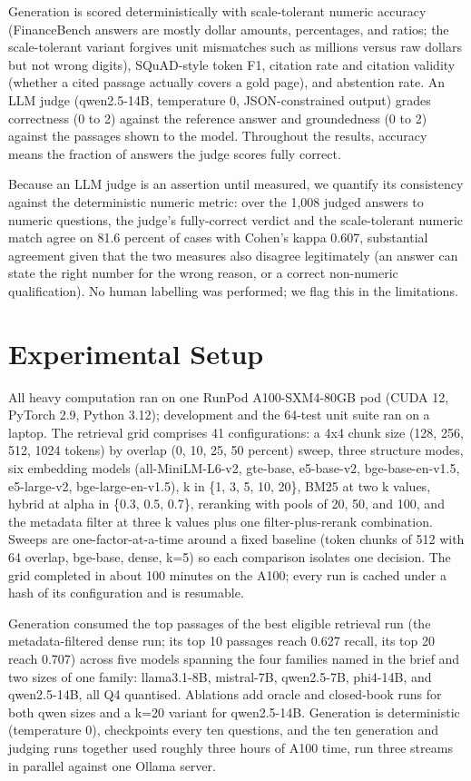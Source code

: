 \documentclass[
  11pt,
]{article}
\begin{document}
Generation is scored deterministically with scale-tolerant numeric
accuracy (FinanceBench answers are mostly dollar amounts, percentages,
and ratios; the scale-tolerant variant forgives unit mismatches such as
millions versus raw dollars but not wrong digits), SQuAD-style token F1,
citation rate and citation validity (whether a cited passage actually
covers a gold page), and abstention rate. An LLM judge (qwen2.5-14B,
temperature 0, JSON-constrained output) grades correctness (0 to 2)
against the reference answer and groundedness (0 to 2) against the
passages shown to the model. Throughout the results, accuracy means the
fraction of answers the judge scores fully correct.

Because an LLM judge is an assertion until measured, we quantify its
consistency against the deterministic numeric metric: over the 1,008
judged answers to numeric questions, the judge's fully-correct verdict
and the scale-tolerant numeric match agree on 81.6 percent of cases with
Cohen's kappa 0.607, substantial agreement given that the two measures
also disagree legitimately (an answer can state the right number for the
wrong reason, or a correct non-numeric qualification). No human
labelling was performed; we flag this in the limitations.

\section{Experimental Setup}\label{experimental-setup}

All heavy computation ran on one RunPod A100-SXM4-80GB pod (CUDA 12,
PyTorch 2.9, Python 3.12); development and the 64-test unit suite ran on
a laptop. The retrieval grid comprises 41 configurations: a 4x4 chunk
size (128, 256, 512, 1024 tokens) by overlap (0, 10, 25, 50 percent)
sweep, three structure modes, six embedding models (all-MiniLM-L6-v2,
gte-base, e5-base-v2, bge-base-en-v1.5, e5-large-v2, bge-large-en-v1.5),
k in \{1, 3, 5, 10, 20\}, BM25 at two k values, hybrid at alpha in
\{0.3, 0.5, 0.7\}, reranking with pools of 20, 50, and 100, and the
metadata filter at three k values plus one filter-plus-rerank
combination. Sweeps are one-factor-at-a-time around a fixed baseline
(token chunks of 512 with 64 overlap, bge-base, dense, k=5) so each
comparison isolates one decision. The grid completed in about 100
minutes on the A100; every run is cached under a hash of its
configuration and is resumable.

Generation consumed the top passages of the best eligible retrieval run
(the metadata-filtered dense run; its top 10 passages reach 0.627
recall, its top 20 reach 0.707) across five models spanning the four
families named in the brief and two sizes of one family: llama3.1-8B,
mistral-7B, qwen2.5-7B, phi4-14B, and qwen2.5-14B, all Q4 quantised.
Ablations add oracle and closed-book runs for both qwen sizes and a k=20
variant for qwen2.5-14B. Generation is deterministic (temperature 0),
checkpoints every ten questions, and the ten generation and judging runs
together used roughly three hours of A100 time, run three streams in
parallel against one Ollama server.
\end{document}
